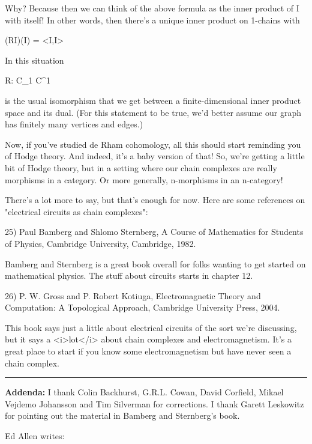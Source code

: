 Why?  Because then we can think of the above formula as the inner
product of I with itself!  In other words, then there's a unique inner
product on 1-chains with

(RI)(I) = <I,I>

In this situation

R: C_{1} \to  C^{1}

is the usual isomorphism that we get between a finite-dimensional
inner product space and its dual.  (For this statement to be true,
we'd better assume our graph has finitely many vertices and edges.)

Now, if you've studied de Rham cohomology, all this should start
reminding you of Hodge theory.  And indeed, it's a baby version
of that!  So, we're getting a little bit of Hodge theory, but in
a setting where our chain complexes are really morphisms in a category.
Or more generally, n-morphisms in an n-category!

There's a lot more to say, but that's enough for now.
Here are some references on "electrical circuits as chain
complexes":

25) Paul Bamberg and Shlomo Sternberg, A Course of Mathematics for
Students of Physics, Cambridge University, Cambridge, 1982.

Bamberg and Sternberg is a great book overall for folks wanting to 
get started on mathematical physics.  The stuff about circuits
starts in chapter 12.  

26) P. W. Gross and P. Robert Kotiuga, Electromagnetic Theory and
Computation: A Topological Approach, Cambridge University Press, 2004.

This book says just a little about electrical circuits of the sort
we're discussing, but it says a <i>lot</i> about chain complexes
and electromagnetism.  It's a great place to start if you know some
electromagnetism but have never seen a chain complex.


\par\noindent\rule{\textwidth}{0.4pt}

\textbf{Addenda:} I thank Colin Backhurst, G.R.L. Cowan, David Corfield, Mikael
Vejdemo Johansson and Tim Silverman for corrections.  I thank Garett
Leskowitz for pointing out the material in Bamberg and Sternberg's
book.

Ed Allen writes:

